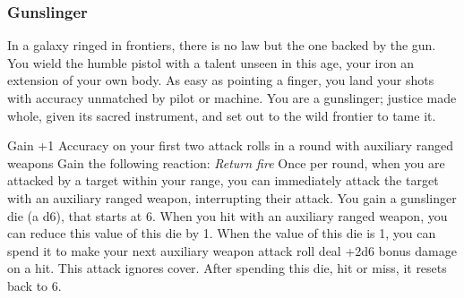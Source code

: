 \subsubsection{Gunslinger}

\begin{talent}
{In a galaxy ringed in frontiers, there is no law but the one backed by the gun. You wield the humble pistol with a talent unseen in this age, your iron an extension of your own body. As easy as pointing a finger, you land your shots with accuracy unmatched by pilot or machine. You are a gunslinger; justice made whole, given its sacred instrument, and set out to the wild frontier to tame it.}

Gain +1 Accuracy on your first two attack rolls in a round with auxiliary ranged weapons
Gain the following reaction:
\textit{Return fire}
\Reaction
Once per round, when you are attacked by a target within your range, you can immediately attack the target with an auxiliary ranged weapon, interrupting their attack. 
You gain a gunslinger die (a d6), that starts at 6. When you hit with an auxiliary ranged weapon, you can reduce this value of this die by 1. When the value of this die is 1, you can spend it to make your next auxiliary weapon attack roll deal +2d6 bonus damage on a hit. This attack ignores cover. After spending this die, hit or miss, it resets back to 6.
\end{talent}